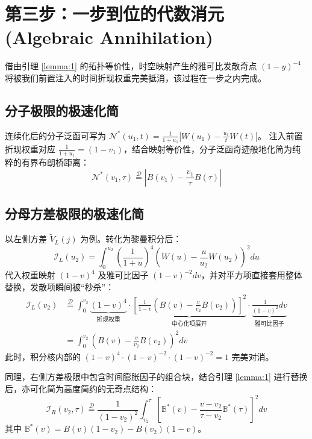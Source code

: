 \documentclass[11pt,a4paper]{article}
\begin{document}
\section{第三步：一步到位的代数消元 (Algebraic Annihilation)}

借由引理 \ref{lemma:1} 的拓扑等价性，时空映射产生的雅可比发散奇点 $(1-y)^{-4}$ 将被我们前置注入的时间折现权重完美抵消，该过程在一步之内完成。

\subsection{分子极限的极速化简}
连续化后的分子泛函可写为 $\mathcal{N}^*(u_1, t) = \frac{1}{1+u_1} \left| W(u_1) - \frac{u_1}{t} W(t) \right|$。
注入前置折现权重对应 $\frac{1}{1+u_1} = (1-v_1)$，结合映射等价性，分子泛函奇迹般地化简为纯粹的有界布朗桥距离：
\begin{equation}
\mathcal{N}^*(v_1, \tau) \stackrel{\mathcal{D}}{=} \left| B(v_1) - \frac{v_1}{\tau} B(\tau) \right|
\end{equation}

\subsection{分母方差极限的极速化简}
以左侧方差 $\tilde{V}_L(j)$ 为例。转化为黎曼积分后：
\begin{equation}
\mathcal{I}_L(u_2) = \int_0^{u_2} \left(\frac{1}{1+u}\right)^4 \left( W(u) - \frac{u}{u_2} W(u_2) \right)^2 du
\end{equation}
代入权重映射 $(1-v)^4$ 及雅可比因子 $(1-v)^{-2} dv$，并对平方项直接套用整体替换，发散项瞬间被“秒杀”：
\begin{equation}
\begin{aligned}
\mathcal{I}_L(v_2) &\stackrel{\mathcal{D}}{=} \int_0^{v_2} \underbrace{(1-v)^4}_{\text{折现权重}} \cdot \underbrace{ \left[ \frac{1}{1-v} \left( B(v) - \frac{v}{v_2} B(v_2) \right) \right]^2}_{\text{中心化项展开}} \cdot \underbrace{\frac{1}{(1-v)^2} dv}_{\text{雅可比因子}} \\
&= \int_0^{v_2} \left( B(v) - \frac{v}{v_2} B(v_2) \right)^2 dv
\end{aligned}
\end{equation}
此时，积分核内部的 $(1-v)^4 \cdot (1-v)^{-2} \cdot (1-v)^{-2} = 1$ 完美对消。

同理，右侧方差极限中包含时间膨胀因子的组合块，结合引理 \ref{lemma:1} 进行替换后，亦可化简为高度简约的无奇点结构：
\begin{equation}
\mathcal{I}_R(v_2, \tau) \stackrel{\mathcal{D}}{=} \frac{1}{(1-v_2)^2} \int_{v_2}^{\tau} \left[ \mathbb{B}^*(v) - \frac{v-v_2}{\tau-v_2} \mathbb{B}^*(\tau) \right]^2 dv
\end{equation}
其中 $\mathbb{B}^*(v) = B(v)(1-v_2) - B(v_2)(1-v)$。
\end{document}

